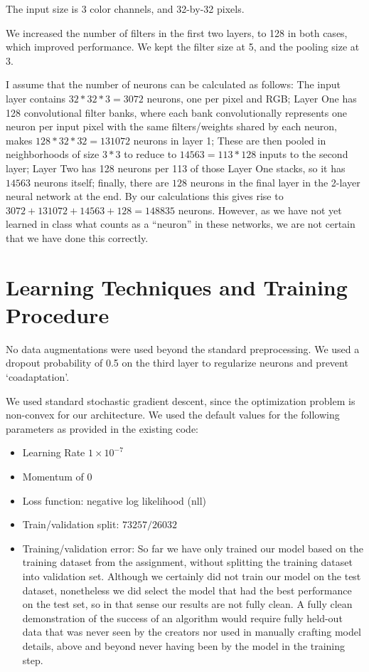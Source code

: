 \documentclass{article}
\begin{document}
The input size is 3 color channels, and 32-by-32 pixels.

We increased the number of filters in the first two layers, to 128 in both cases, which improved performance. We kept the filter size at 5, and the pooling size at 3.

I assume that the number of neurons can be calculated as follows: The input layer contains $32*32*3=3072$ neurons, one per pixel and RGB; Layer One has 128 convolutional filter banks, where each bank convolutionally represents one neuron per input pixel with the same filters/weights shared by each neuron, makes $128 * 32*32 = 131072$ neurons in layer 1; These are then pooled in neighborhoods of size $3*3$ to reduce to $14563 = 113*128$ inputs to the second layer; Layer Two has 128 neurons per 113 of those Layer One stacks, so it has $14563$ neurons itself; finally, there are $128$ neurons in the final layer in the 2-layer neural network at the end. By our calculations this gives rise to $3072 + 131072 + 14563 + 128 = 148835$ neurons. However, as we have not yet learned in class what counts as a ``neuron'' in these networks, we are not certain that we have done this correctly.

\section{Learning Techniques and Training Procedure}
No data augmentations were used beyond the standard preprocessing. We used a dropout probability of 0.5 on the third layer to regularize neurons and prevent `coadaptation'.

We used standard stochastic gradient descent, since the optimization problem is
non-convex for our architecture. We used the default values for the following parameters as provided in the existing code:
\begin{itemize}
\item Learning Rate $1 \times 10^{-7}$
\item Momentum of $0$
\item Loss function: negative log likelihood (nll)
\item Train/validation split: $73257/26032$
\item Training/validation error: So far we have only trained our model based on the training dataset from the assignment, without splitting the training dataset into validation set. Although we certainly did not train our model on the test dataset, nonetheless we did select the model that had the best performance on the test set, so in that sense our results are not fully clean. A fully clean demonstration of the success of an algorithm would require fully held-out data that was never seen by the creators nor used in manually crafting model details, above and beyond never having been by the model in the training step.
\end{itemize}
\end{document}
